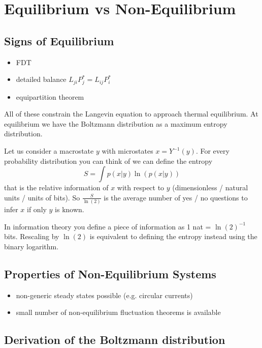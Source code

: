 \documentclass{/home/ben/Templates/notebook}
\begin{document}
	\newpage
	
	\section{Equilibrium vs Non-Equilibrium}
	
	\subsection*{Signs of Equilibrium}
	
	\begin{itemize}
		\item FDT
		\item detailed balance $L_{ji}P_j^* = L_{ij}P_i^*$
		\item equipartition theorem
	\end{itemize}
	
	All of these constrain the Langevin equation to approach thermal equilibrium. At equilibrium we have the Boltzmann distribution as a maximum entropy distribution. 
	
	Let us consider a macrostate $y$ with microstates $x = Y^{-1}(y)$. For every probability distribution you can think of we can define the entropy
	\begin{equation}
	S = \int p(x|y) \ln(p(x|y))
	\end{equation}
	that is the relative information of $x$ with respect to $y$ (dimensionless / natural units / units of bits). So $\frac{S}{\ln(2)}$ is the average number of yes / no questions to infer $x$ if only $y$ is known.
	
	In information theory you define a piece of information as 1 nat = $\ln(2)^{-1}$ bits. Rescaling by $\ln(2)$ is equivalent to defining the entropy instead using the binary logarithm.
	
	\subsection*{Properties of Non-Equilibrium Systems}
	
	\begin{itemize}
		\item non-generic steady states possible (e.g. circular currents)
		\item small number of non-equilibrium fluctuation theorems is available
	\end{itemize}
	
	\subsection*{Derivation of the Boltzmann distribution}
	
\end{document}

